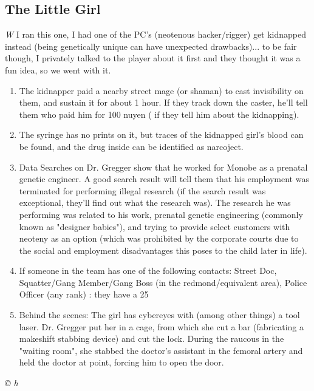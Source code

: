\documentclass[letterpaper,onecolumn,10pt]{article}
\renewcommand{\textsc}[1]{{\fontspec{Friz Quadrata SC TT}\selectfont #1}}
\newcommand{\getyear}[1]{\StrLeft{#1}{4}}
\newenvironment{scenario}[6]
	{
		\section[#1 {\small\textsc{[#2]}}]{#1} \nopagebreak

		\noindent{\textsc{#2}}\nopagebreak

		\noindent\textit{#3}\nopagebreak
		\def\TMPSCENARIO{{\small\textit{©\getyear{#5}{} #4}}}
	}
	{\TMPSCENARIO}
\newcommand{\notes}{\textbf{Notes: }}
\begin{document}
\begin{multicols}{2}
\begin{scenario}{The Little Girl}
\notes When I ran this one, I had one of the PC's (neotenous hacker/rigger) get kidnapped instead (being genetically unique can have unexpected drawbacks)... to be fair though, I privately talked to the player about it first and they thought it was a fun idea, so we went with it.

\begin{enumerate}

\item The kidnapper paid a nearby street mage (or shaman) to cast invisibility on them, and sustain it for about 1 hour. If they track down the caster, he'll tell them who paid him for 100 nuyen ( if they tell him about the kidnapping).

\item The syringe has no prints on it, but traces of the kidnapped girl's blood can be found, and the drug inside can be identified as narcoject.

\item Data Searches on Dr. Gregger show that he worked for Monobe as a prenatal genetic engineer. A good search result will tell them that his employment was terminated for performing illegal research (if the search result was exceptional, they'll find out what the research was). The research he was performing was related to his work, prenatal genetic engineering (commonly known as "designer babies"), and trying to provide select customers with neoteny as an option (which was prohibited by the corporate courts due to the social and employment disadvantages this poses to the child later in life).

\item If someone in the team has one of the following contacts: Street Doc, Squatter/Gang Member/Gang Boss (in the redmond/equivalent area), Police Officer (any rank) : they have a 25%

\item Behind the scenes: The girl has cybereyes with (among other things) a tool laser. Dr. Gregger put her in a cage, from which she cut a bar (fabricating a makeshift stabbing device) and cut the lock. During the raucous in the "waiting room", she stabbed the doctor's assistant in the femoral artery and held the doctor at point, forcing him to open the door.


\end{enumerate}
\end{scenario}
\end{multicols}
\end{document}
